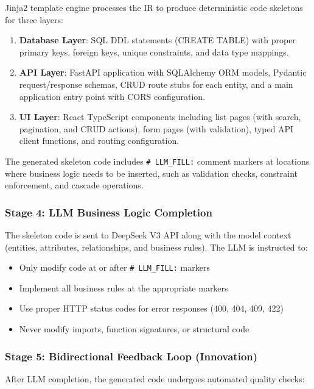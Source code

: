\documentclass[11pt,a4paper]{article}
\begin{document}
Jinja2 template engine processes the IR to produce deterministic code skeletons for three layers:

\begin{enumerate}[leftmargin=*]
    \item \textbf{Database Layer}: SQL DDL statements (CREATE TABLE) with proper primary keys, foreign keys, unique constraints, and data type mappings.
    \item \textbf{API Layer}: FastAPI application with SQLAlchemy ORM models, Pydantic request/response schemas, CRUD route stubs for each entity, and a main application entry point with CORS configuration.
    \item \textbf{UI Layer}: React TypeScript components including list pages (with search, pagination, and CRUD actions), form pages (with validation), typed API client functions, and routing configuration.
\end{enumerate}

The generated skeleton code includes {\lstinline|# LLM_FILL:|} comment markers at locations where business logic needs to be inserted, such as validation checks, constraint enforcement, and cascade operations.

\subsubsection{Stage 4: LLM Business Logic Completion}

The skeleton code is sent to DeepSeek V3 API along with the model context (entities, attributes, relationships, and business rules). The LLM is instructed to:

\begin{itemize}
    \item Only modify code at or after {\lstinline|# LLM_FILL:|} markers
    \item Implement all business rules at the appropriate markers
    \item Use proper HTTP status codes for error responses (400, 404, 409, 422)
    \item Never modify imports, function signatures, or structural code
\end{itemize}

\subsubsection{Stage 5: Bidirectional Feedback Loop (Innovation)}

After LLM completion, the generated code undergoes automated quality checks:
\end{document}
